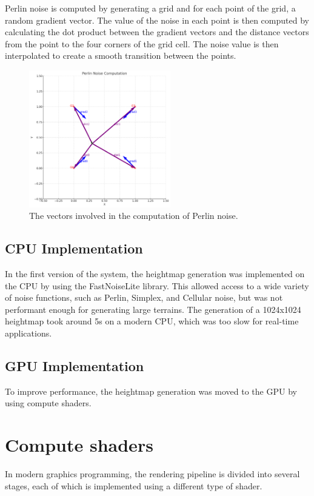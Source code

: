 \documentclass{report}
\begin{document}
Perlin noise is computed by generating a grid and for each point of the grid, a random gradient vector.
The value of the noise in each point is then computed by calculating the dot product between the gradient vectors and the distance vectors from the point to the four corners of the grid cell.
The noise value is then interpolated to create a smooth transition between the points.

\begin{figure}[h!]
	\centering
	\includegraphics[width=0.55\textwidth]{img/perlin.png}
	\caption{The vectors involved in the computation of Perlin noise.}
	\label{fig:perlin_vectors}
\end{figure}


\subsection{CPU Implementation}
In the first version of the system, the heightmap generation was implemented on the CPU by using
the FastNoiseLite library. This allowed access to a wide variety of noise functions, such as
Perlin, Simplex, and Cellular noise, but was not performant enough for generating large terrains.
The generation of a 1024x1024 heightmap took around 5s on a modern CPU, which was too slow for
real-time applications.
\subsection{GPU Implementation}
To improve performance, the heightmap generation was moved to the GPU by using compute shaders.

\section{Compute shaders}
In modern graphics programming, the rendering pipeline is divided into several stages, each of
which is implemented using a different type of shader.
\end{document}
